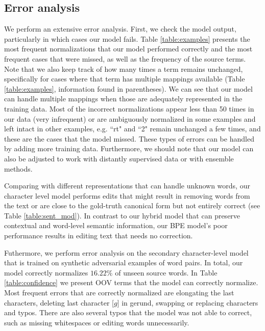 \documentclass[letterpaper]{article} \usepackage{aaai19}  \usepackage{times}  \usepackage{helvet} \usepackage{courier}  \usepackage[hyphens]{url}  \usepackage{graphicx} \urlstyle{rm} \def\UrlFont{\rm}  \usepackage{graphicx}  \frenchspacing  \setlength{\pdfpagewidth}{8.5in}  \setlength{\pdfpageheight}{11in}
\begin{document}
\subsection{Error analysis}
We perform an extensive error analysis. First, we check the model output, particularly in which cases our model fails. Table \ref{table:examples} presents the most frequent normalizations that our model performed correctly and the most frequent cases that were missed, as well as the frequency of the source terms. Note that we also keep track of how many times a term remains unchanged, specifically for cases where that term has multiple mappings available  (Table \ref{table:examples}, information found in parentheses). We can see that our model can handle multiple mappings when those are adequately represented in the training data. Most of the incorrect normalizations appear less than 50 times in our data (very infrequent) or are ambiguously normalized in some examples and left intact in other examples, e.g. ``rt" and ``2" remain unchanged a few times, and these are the cases that the model missed.  These types of errors can be handled by adding more training data. Furthermore, we should note that our model can also be adjusted to work with distantly supervised data or with ensemble methods.

Comparing with different representations that can handle unknown words, our character level model performs edits that might result in removing words from the text or are close to the gold-truth canonical form but not entirely correct (see Table \ref{table:sent_mod}). In contrast to our hybrid model that can preserve contextual and word-level semantic information, our BPE model's poor performance results in editing text that needs no correction.

Futhermore, we perform error analysis on the secondary character-level model that is trained on synthetic adversarial examples of word pairs. In total, our model correctly normalizes $16.22\%$ of unseen source words. In Table \ref{table:confidence} we present OOV terms that the model can correctly normalize. Most frequent errors that are correctly normalized are elongating the last characters, deleting last character [$g$] in gerund, swapping or replacing characters and typos. There are also several typos that the model was not able to correct, such as missing whitespaces or editing words unnecessarily. 
\end{document}
